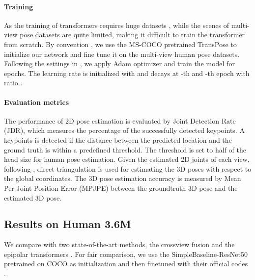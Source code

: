 \documentclass{bmvc2k}
\begin{document}
\paragraph{Training} 
As the training of transformers requires huge datasets \cite{vaswani2017attention, dosovitskiy2020image}, while the scenes of multi-view pose datasets are quite limited, making it difficult to train the transformer from scratch. 
By convention \cite{iskakov2019learnable, he2020epipolar}, 
we use the MS-COCO \cite{lin2014microsoft} pretrained TransPose \cite{yang2020transpose} to initialize our network and fine tune it on the multi-view human pose datasets. Following the settings in \cite{he2020epipolar}, we apply Adam optimizer \cite{kingma2014adam} and train the model for  epochs. The learning rate is initialized with  and decays at -th and -th epoch with ratio . 


\vspace{-0.8em}
\paragraph{Evaluation metrics}
The performance of 2D pose estimation is evaluated by Joint Detection
Rate (JDR), which measures the percentage of the successfully detected keypoints. A keypoints is detected if the distance between the predicted location and the ground truth is within a predefined threshold. The threshold is set to half of the head size for human pose estimation. 
Given the estimated 2D joints of each view, following \cite{qiu2019cross, he2020epipolar}, direct triangulation is used for estimating the 3D poses with respect to the global coordinates. 
The 3D pose estimation accuracy is measured by Mean Per Joint Position Error (MPJPE) between the groundtruth 3D pose and the estimated 3D pose. 


\vspace{-0.7em}
\subsection{Results on Human 3.6M}
\vspace{-0.7em}
We compare with two state-of-the-art methods, the crossview fusion \cite{qiu2019cross} and the epipolar transformers \cite{he2020epipolar}. For fair comparison, we use the SimpleBaseline-ResNet50 pretrained on COCO \cite{xiao2018simple} as initialization and then finetuned with their official codes \cite{qiu2019cross, he2020epipolar}. 
\end{document}
